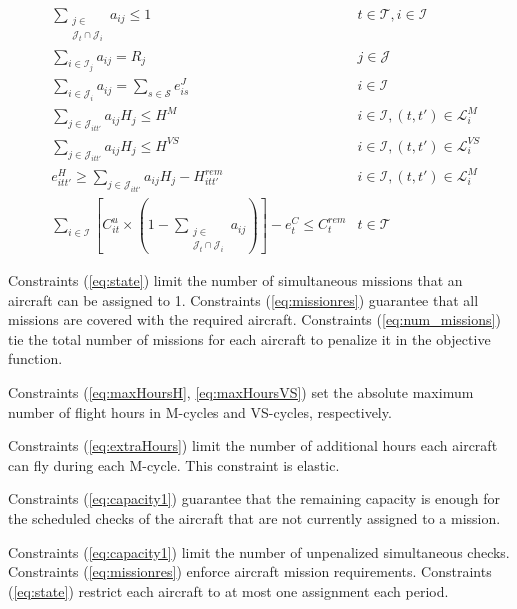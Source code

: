   \begin{align}
    & \sum_{\substack{j \in \\ \mathcal{J}_t \cap \mathcal{J}_i}} 
    a_{ij} \leq 1 
            & t \in \mathcal{T}, i \in \mathcal{I} \label{eq:state} \\ 
    & \sum_{i \in \mathcal{I}_j} a_{ij} = R_j
            & j \in \mathcal{J}  \label{eq:missionres}\\
    & \sum_{i \in \mathcal{J}_i} a_{ij} = \sum_{s \in \mathcal{S}} e^{J}_{is}
            & i \in \mathcal{I}  \label{eq:num_missions}\\
    & \sum_{j \in \mathcal{J}_{itt'}} a_{ij} H_j \leq H^{M}
            & i \in \mathcal{I}, (t, t') \in \mathcal{L}^M_{i} \label{eq:maxHoursH}\\
    & \sum_{j \in \mathcal{J}_{itt'}} a_{ij} H_j \leq H^{VS}
            & i \in \mathcal{I}, (t, t') \in \mathcal{L}^{VS}_{i} \label{eq:maxHoursVS}\\
    & e^{H}_{itt'} \geq \sum_{j \in \mathcal{J}_{itt'}} a_{ij} H_j - H^{rem}_{itt'} 
            & i \in \mathcal{I}, (t, t') \in \mathcal{L}^M_{i} \label{eq:extraHours}\\
    &\sum_{i \in \mathcal{I}} [C^{u}_{it} \times (1 - \sum_{\substack{j \in \\ \mathcal{J}_t \cap \mathcal{J}_i}} a_{ij})] 
    - e^{C}_{t} \leq C^{rem}_{t}
            & t \in \mathcal{T} \label{eq:capacity1}
  \end{align}

  Constraints (\ref{eq:state}) limit the number of simultaneous missions that an aircraft can be assigned to 1. Constraints (\ref{eq:missionres}) guarantee that all missions are covered with the required aircraft. Constraints (\ref{eq:num_missions}) tie the total number of missions for each aircraft to penalize it in the objective function.

  Constraints (\ref{eq:maxHoursH}, \ref{eq:maxHoursVS}) set the absolute maximum number of flight hours in M-cycles and VS-cycles, respectively.

  Constraints (\ref{eq:extraHours}) limit the number of additional hours each aircraft can fly during each M-cycle. This constraint is elastic.

  Constraints (\ref{eq:capacity1}) guarantee that the remaining capacity is enough for the scheduled checks of the aircraft that are not currently assigned to a mission.

  Constraints (\ref{eq:capacity1}) limit the number of unpenalized simultaneous checks. Constraints (\ref{eq:missionres}) enforce aircraft mission requirements. Constraints (\ref{eq:state}) restrict each aircraft to at most one assignment each period.
